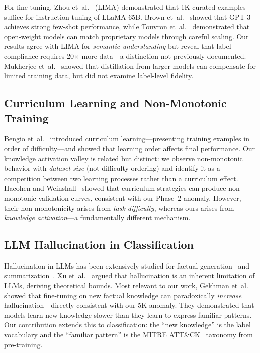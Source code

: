 \documentclass[review,3p]{elsarticle}
\begin{document}
For fine-tuning, Zhou et~al.~\cite{zhou2023} (LIMA) demonstrated that 1K curated examples suffice for instruction tuning of LLaMA-65B. Brown et~al.~\cite{brown2020} showed that GPT-3 achieves strong few-shot performance, while Touvron et~al.~\cite{touvron2023} demonstrated that open-weight models can match proprietary models through careful scaling. Our results agree with LIMA for \emph{semantic understanding} but reveal that label compliance requires 20$\times$ more data---a distinction not previously documented. Mukherjee et~al.~\cite{mukherjee2023} showed that distillation from larger models can compensate for limited training data, but did not examine label-level fidelity.

\subsection{Curriculum Learning and Non-Monotonic Training}
Bengio et~al.~\cite{bengio2009} introduced curriculum learning---presenting training examples in order of difficulty---and showed that learning order affects final performance. Our knowledge activation valley is related but distinct: we observe non-monotonic behavior with \emph{dataset size} (not difficulty ordering) and identify it as a competition between two learning processes rather than a curriculum effect. Hacohen and Weinshall~\cite{hacohen2019} showed that curriculum strategies can produce non-monotonic validation curves, consistent with our Phase~2 anomaly. However, their non-monotonicity arises from \emph{task difficulty}, whereas ours arises from \emph{knowledge activation}---a fundamentally different mechanism.

\subsection{LLM Hallucination in Classification}
Hallucination in LLMs has been extensively studied for factual generation~\cite{ji2023,huang2023} and summarization~\cite{maynez2020}. Xu et~al.~\cite{xu2024} argued that hallucination is an inherent limitation of LLMs, deriving theoretical bounds. Most relevant to our work, Gekhman et~al.~\cite{gekhman2024} showed that fine-tuning on new factual knowledge can paradoxically \emph{increase} hallucination---directly consistent with our 5K anomaly. They demonstrated that models learn new knowledge slower than they learn to express familiar patterns. Our contribution extends this to classification: the ``new knowledge'' is the label vocabulary and the ``familiar pattern'' is the MITRE ATT\&CK~\cite{mitre2024} taxonomy from pre-training.
\end{document}
